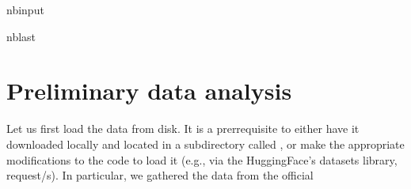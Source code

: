 \documentclass[letterpaper,10pt,english]{sphinxmanual}
\begin{document}
\begin{sphinxuseclass}{nbinput}
\begin{sphinxuseclass}{nblast}
{
\begin{sphinxVerbatim}[commandchars=\\\{\}]
\llap{\color{nbsphinxin}[28]:\,\hspace{\fboxrule}\hspace{\fboxsep}}   
   
     
   
    
   
\end{sphinxVerbatim}
}

\end{sphinxuseclass}
\end{sphinxuseclass}

\section{Preliminary data analysis}
\label{\detokenize{eda:Preliminary-data-analysis}}
\sphinxAtStartPar
Let us first load the data from disk. It is a prerrequisite to either have it downloaded locally and located in a subdirectory called , or make the appropriate modifications to the code to load it (e.g., via the HuggingFace’s datasets library,  request/s). In particular, we gathered the data from the  official 
\end{document}
